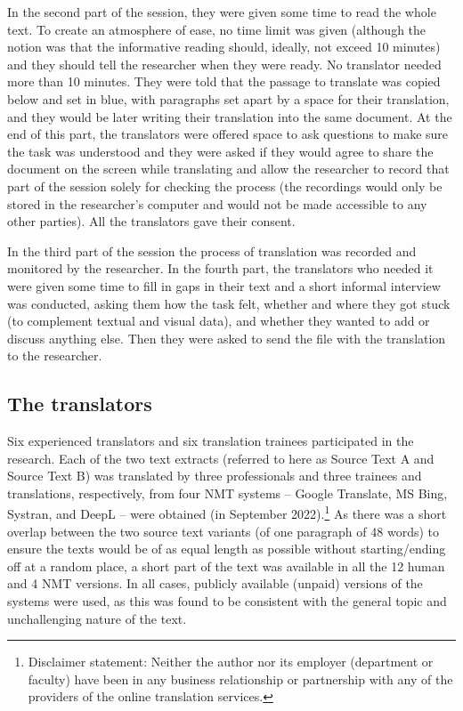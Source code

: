 \documentclass[output=paper]{langscibook}
\begin{document}
In the second part of the session, they were given some time to read the whole text. To create an atmosphere of ease, no time limit was given (although the notion was that the informative reading should, ideally, not exceed 10 minutes) and they should tell the researcher when they were ready. No translator needed more than 10 minutes. They were told that the passage to translate was copied below and set in blue, with paragraphs set apart by a space for their translation, and they would be later writing their translation into the same document. At the end of this part, the translators were offered space to ask questions to make sure the task was understood and they were asked if they would agree to share the document on the screen while translating and allow the researcher to record that part of the session solely for checking the process (the recordings would only be stored in the researcher’s computer and would not be made accessible to any other parties). All the translators gave their consent.

In the third part of the session the process of translation was recorded and monitored by the researcher. In the fourth part, the translators who needed it were given some time to fill in gaps in their text and a short informal interview was conducted, asking them how the task felt, whether and where they got stuck (to complement textual and visual data), and whether they wanted to add or discuss anything else. Then they were asked to send the file with the translation to the researcher.

\subsection{The translators}

Six experienced translators and six translation trainees participated in the research. Each of the two text extracts (referred to here as Source Text A and Source Text B) was translated by three professionals and three trainees and translations, respectively, from four NMT systems – Google Translate, MS Bing, Systran, and DeepL – were obtained (in  {September 2022}).\footnote{Disclaimer statement: Neither the author nor its employer (department or faculty) have been in any business relationship or partnership with any of the providers of the online translation services.} As there was a short overlap between the two source text variants (of one paragraph of 48 words) to ensure the texts would be of as equal length as possible without starting/ending off at a random place, a short part of the text was available in all the 12 human and 4 NMT versions. In all cases, publicly available (unpaid) versions of the systems were used, as this was found to be consistent with the general topic and unchallenging nature of the text.
\end{document}
